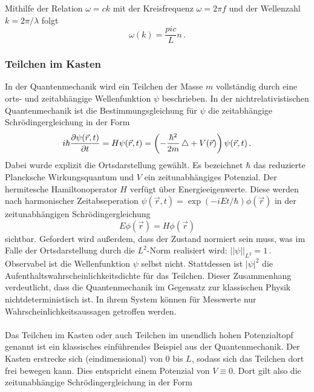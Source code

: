 Mithilfe der Relation $\omega = ck$ mit der Kreisfrequenz $\omega = 2 \pi f$ und der Wellenzahl $k = 2 \pi / \lambda$ folgt
\begin{equation}
  \omega(k) = \frac{pi c}{L} n\,.
  \label{eqn:dispersionKlassisch}
\end{equation}

\subsubsection{Teilchen im Kasten}
\label{subsubsec:kasten}
In der Quantenmechanik wird ein Teilchen der Masse $m$ vollständig durch eine orts- und zeitabhängige Wellenfunktion $\psi$ beschrieben. In der nichtrelativistischen Quantenmechanik ist die Bestimmungsgleichung für $\psi$ die zeitabhängige Schrödingergleichung in der Form
\begin{equation}
  i \hbar \frac{\partial \psi(\vec{r},t)}{\partial t} = H \psi(\vec{r},t) = \left(- \frac{\hbar^2}{2 m} \mathop{}\!\mathbin\bigtriangleup + V(\vec{r})\right) \psi(\vec{r},t)\,.
  \label{eqn:schroedingerZeitabhaengig}
\end{equation}
Dabei wurde explizit die Ortsdarstellung gewählt. Es bezeichnet $\hbar$ das reduzierte Plancksche Wirkungsquantum und $V$ ein zeitunabhängiges Potenzial. Der hermitesche Hamiltonoperator $H$ verfügt über Energieeigenwerte. Diese werden nach harmonischer Zeitabseperation $\psi(\vec{r},t) = \exp(-i E t / \hbar) \phi(\vec{r})$ in der zeitunabhängigen Schrödingergleichung
\begin{equation}
  E \phi(\vec{r}) = H \phi(\vec{r})
  \label{eqn:schroedingerZeitunabhaengig}
\end{equation}
sichtbar. Gefordert wird außerdem, dass der Zustand normiert sein muss, was im Falle der Ortsdarstellung durch die $L^2$-Norm realisiert wird: $\lvert\lvert \psi \rvert\rvert_{L^2} = 1\,.$ Observabel ist die Wellenfunktion $\psi$ selbst nicht. Stattdessen ist $\lvert \psi \rvert ^2$ die Aufenthaltswahrscheinlichkeitsdichte für das Teilchen. Dieser Zusammenhang verdeutlicht, dass die Quantenmechanik im Gegensatz zur klassischen Physik nichtdeterministisch ist. In ihrem System können für Messwerte nur Wahrscheinlichkeitsaussagen getroffen werden.
\\\\
Das Teilchen im Kasten oder auch Teilchen im unendlich hohen Potenzialtopf genannt ist ein klassisches einführendes Beispiel aus der Quantenmechanik. Der Kasten erstrecke sich (eindimensional) von 0 bis $L$, sodass sich das Teilchen dort frei bewegen kann. Dies entspricht einem Potenzial von $V \equiv 0$. Dort gilt also die zeitunabhängige Schrödingergleichung in der Form
